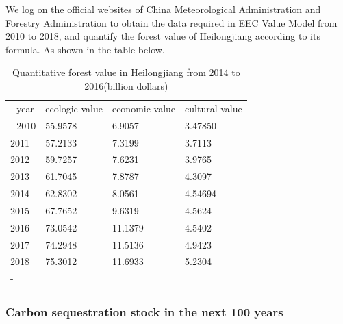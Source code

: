 We log on the official websites of China Meteorological Administration and Forestry Administration to obtain the data required in EEC Value Model from 2010 to 2018, and quantify the forest value of Heilongjiang according to its formula. As shown in the table below.

\begin{table}[h]
	\centering
	\caption{Quantitative forest value in Heilongjiang from 2014 to 2016(billion dollars)}
	\tabulinesep=1mm
	\begin{tabu}to \linewidth{X[0.9,c,m]X[1.4,c,m]X[1.4,c,m]X[1.4,c,m]}
		\tabucline[0.08em]-
		year           & ecologic value    & economic value  &cultural value         \\\tabucline[0.08em]-
		2010      & 55.9578 & 6.9057 & 3.47850 \\
        2011      & 57.2133 & 7.3199 & 3.7113 \\
        2012      & 59.7257 & 7.6231 & 3.9765 \\
        2013      & 61.7045 & 7.8787 & 4.3097 \\
        2014	   & 62.8302      & 8.0561    &4.54694  \\
		2015	   & 67.7652   & 9.6319    &4.5624  \\
		2016	   & 73.0542    &11.1379  &4.5402   \\
        2017       & 74.2948  & 11.5136  &4.9423 \\
        2018      &  75.3012  & 11.6933  &5.2304 \\
        
		\tabucline[0.08em]-
	\end{tabu}
    \label{table5}
\end{table}

\subsubsection{Carbon sequestration stock in the next 100 years}

